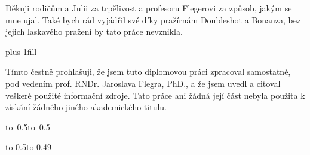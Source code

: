 \documentclass[12pt,a4paper]{report}
\let\openright=\clearpage
\begin{document}
\openright

\noindent
Děkuji rodičům a Julii za trpělivost a profesoru Flegerovi za způsob, jakým se mne ujal. Také bych rád vyjádřil své díky pražírnám Doubleshot a Bonanza, bez jejich laskavého pražení by tato práce nevznikla.

\newpage


\vglue 0pt plus 1fill

\noindent
Tímto čestně prohlašuji, že jsem tuto diplomovou práci zpracoval samostatně, pod vedením prof. RNDr. Jaroslava Flegra, PhD., a že jsem uvedl a citoval veškeré použité informační zdroje. Tato práce ani žádná její část nebyla použita k získání žádného jiného akademického titulu.

\vspace{10mm}

\hbox{\hbox to 0.5\hbox to 0.5}

\vspace{20mm}
\newpage


\vbox to 0.5\nobreak\vbox to 0.49
\end{document}
